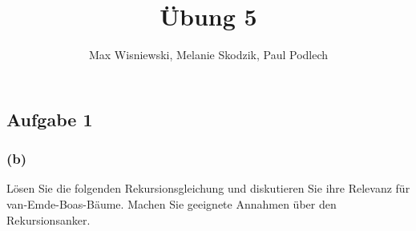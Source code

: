 \documentclass[11pt,a4paper,ngerman]{article}
\date{}
\title{Übung 5}
\author{Max Wisniewski, Melanie Skodzik, Paul Podlech}
\begin{document}

\renewcommand{\figurename}{Grafik}

\maketitle
\thispagestyle{fancy}


\subsection*{Aufgabe 1}



\newpage

\subsubsection*{(b)}

Lösen Sie die folgenden Rekursionsgleichung und diskutieren Sie ihre Relevanz für van-Emde-Boas-Bäume. Machen Sie geeignete Annahmen über den Rekursionsanker.
\end{document}
